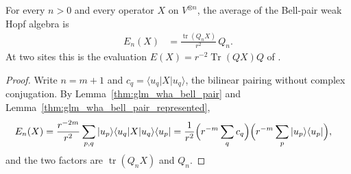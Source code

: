 \begin{lemma}
    \label{thm:glm_wha_bell_pair_two_site}
    \leanok
    For every $n>0$ and every operator $X$ on $V^{\otimes n}$, the average of
    the Bell-pair weak Hopf algebra is
    \begin{align*}
        E_n(X) & =\frac{\operatorname{tr}(Q_nX)}{r^2}\,Q_n.
    \end{align*}
    At two sites this is the evaluation
    $E(X)=r^{-2}\operatorname{Tr}(QX)Q$ of
    \cite{gap:glm23_wha_parent_completion}.
\end{lemma}
\begin{proof}
    \leanok
    Write $n=m+1$ and $c_q=\langle u_q|X|u_q\rangle$, the bilinear pairing
    without complex conjugation. By Lemma~\ref{thm:glm_wha_bell_pair} and
    Lemma~\ref{thm:glm_wha_bell_pair_represented},
    \begin{align*}
        E_n(X) & =\frac{r^{-2m}}{r^2}\sum_{p,q}|u_p\rangle\langle u_q|X
        |u_q\rangle\langle u_p|
        =\frac{1}{r^2}\Bigl(r^{-m}\sum_qc_q\Bigr)\Bigl(r^{-m}\sum_p
        |u_p\rangle\langle u_p|\Bigr),
    \end{align*}
    and the two factors are $\operatorname{tr}(Q_nX)$ and $Q_n$.
\end{proof}

